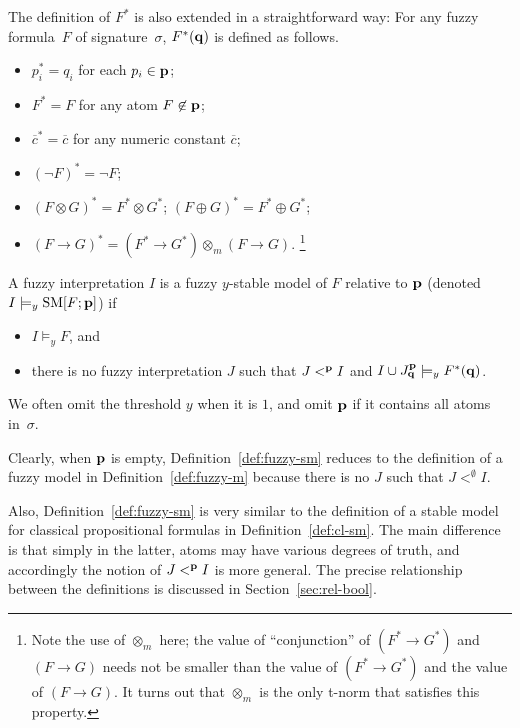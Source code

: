 \documentclass[runningheads]{llncs}
\def\o{\overline}
\def\bi{\begin{itemize}}
\def\ei{\end{itemize}}
\def\sm{\hbox{\rm SM}}
\def\rar{\rightarrow}
\def\fand{\otimes}
\def\for{\oplus}
\def\frar{\rar}
\begin{document}
The definition of $F^*$ is also extended in a straightforward way: 
For any fuzzy formula~$F$ of signature~$\sigma$, $F^*({\bf q})$ is
defined as follows. 

                                                  
\begin{itemize}
\item  $p_i^* = q_i$ for each $p_i\in{\bf p}$; 
\item  $F^* = F$ for any atom $F\not\in {\bf p}$;
\item  $\o{c}^* = \o{c}$ for any numeric constant $\o{c}$;
\item  $(\neg F)^* = \neg F$;
\item  $(F\fand G)^* = F^*\fand G^*$; \qquad
       $(F\for G)^* = F^* \for G^*$;
\item  $(F\frar G)^* = (F^*\frar G^*)\fand_m (F \rar G)$. \footnote{%
Note the use of $\fand_m$ here; the value of
``conjunction'' of $(F^*\rar G^*)$ and $(F\rar G)$ needs not be smaller
than the value of $(F^*\rar G^*)$ and the value of $(F\rar G)$. It turns out that $\fand_m$ is the only t-norm that satisfies this property.}
\end{itemize}


\begin{definition}\label{def:fuzzy-sm}
A fuzzy interpretation $I$ is a fuzzy $y$-stable model of $F$ relative
to ${\bf p}$ (denoted $I\models_y\sm[F; {\bf p}]$) if 
\bi 
\item $I \models_y F$, and
\item there is no fuzzy interpretation $J$ such that  $J<^{\bf p} I$ and $I\cup
J^{\bf p}_{\bf q}\models_y F^*({\bf q})$.
\ei
\end{definition}

We often omit the threshold $y$ when it is $1$, and omit ${\bf p}$
if it contains all atoms in~$\sigma$. 

Clearly, when ${\bf p}$ is empty, Definition~\ref{def:fuzzy-sm}
reduces to the definition of a fuzzy model in
Definition~\ref{def:fuzzy-m} because there is no $J$ such
that $J<^\emptyset I$.

Also, Definition~\ref{def:fuzzy-sm} is very similar to the definition
of a stable model for classical propositional formulas in
Definition~\ref{def:cl-sm}. The main difference
is that simply in the latter, atoms may have various degrees of truth, and
accordingly the notion of $J<^{\bf p} I$ is more general. The
precise relationship between the definitions is discussed in
Section~\ref{sec:rel-bool}.
\end{document}

